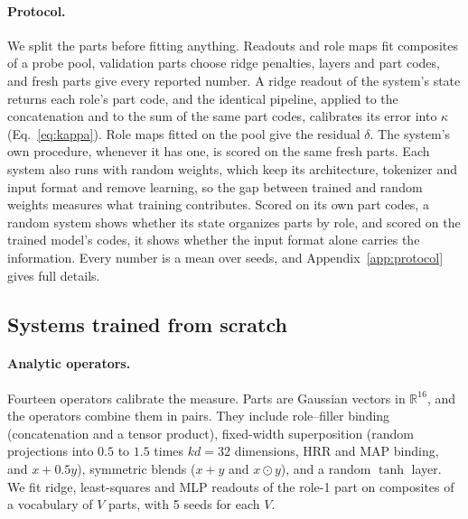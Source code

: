 \documentclass[10pt]{article}
\theoremstyle{plain}
\theoremstyle{remark}
\newcommand{\R}{\mathbb{R}}
\begin{document}
\paragraph{Protocol.} We split the parts before fitting anything. Readouts and role maps fit composites of a probe pool, validation parts choose ridge penalties, layers and part codes, and fresh parts give every reported number. A ridge readout of the system's state returns each role's part code, and the identical pipeline, applied to the concatenation and to the sum of the same part codes, calibrates its error into $\kappa$ (Eq.~\ref{eq:kappa}). Role maps fitted on the pool give the residual $\delta$. The system's own procedure, whenever it has one, is scored on the same fresh parts. Each system also runs with random weights, which keep its architecture, tokenizer and input format and remove learning, so the gap between trained and random weights measures what training contributes. Scored on its own part codes, a random system shows whether its state organizes parts by role, and scored on the trained model's codes, it shows whether the input format alone carries the information. Every number is a mean over seeds, and Appendix~\ref{app:protocol} gives full details.

\subsection{Systems trained from scratch}
\label{sec:design_scratch}

\paragraph{Analytic operators.} Fourteen operators calibrate the measure. Parts are Gaussian vectors in $\R^{16}$, and the operators combine them in pairs. They include role--filler binding (concatenation and a tensor product), fixed-width superposition (random projections into $0.5$ to $1.5$ times $kd = 32$ dimensions, HRR and MAP binding, and $x + 0.5y$), symmetric blends ($x + y$ and $x \odot y$), and a random $\tanh$ layer. We fit ridge, least-squares and MLP readouts of the role-1 part on composites of a vocabulary of $V$ parts, with 5 seeds for each $V$.
\end{document}
